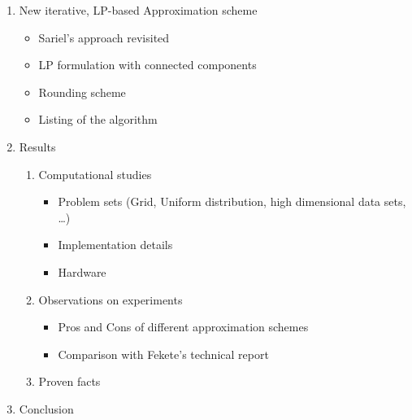\documentclass[a4paper,pagesize]{scrartcl}
\begin{document}
\begin{enumerate}
        \item New iterative, LP-based Approximation scheme
            \begin{itemize}
                \item Sariel's approach revisited
                \item LP formulation with connected components
                \item Rounding scheme
                \item Listing of the algorithm
            \end{itemize}

        \item Results
            \begin{enumerate}
                \item Computational studies
                    \begin{itemize}
                        \item Problem sets (Grid, Uniform distribution, high
                            dimensional data sets, \dots)
                        \item Implementation details
                        \item Hardware
                    \end{itemize}
                \item Observations on experiments
                    \begin{itemize}
                        \item Pros and Cons of different approximation schemes
                        \item Comparison with Fekete's technical report
                    \end{itemize}
                \item Proven facts
            \end{enumerate}

        \item Conclusion
    \end{enumerate}
\end{document}
